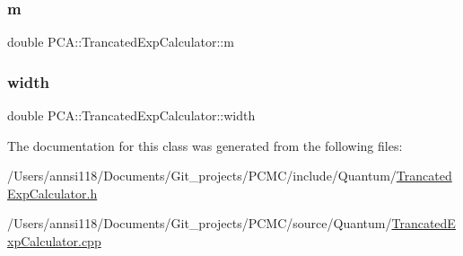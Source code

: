 \subsubsection{\texorpdfstring{m}{m}}
{\footnotesize\ttfamily double P\+C\+A\+::\+Trancated\+Exp\+Calculator\+::m\hspace{0.3cm}{\ttfamily [private]}}

\hypertarget{class_p_c_a_1_1_trancated_exp_calculator_a18ac7bab1a2ddc18bc214a089d05e4ee}{}\label{class_p_c_a_1_1_trancated_exp_calculator_a18ac7bab1a2ddc18bc214a089d05e4ee} 
\subsubsection{\texorpdfstring{width}{width}}
{\footnotesize\ttfamily double P\+C\+A\+::\+Trancated\+Exp\+Calculator\+::width\hspace{0.3cm}{\ttfamily [private]}}



The documentation for this class was generated from the following files\+:\begin{DoxyCompactItemize}
\item 
/\+Users/annsi118/\+Documents/\+Git\+\_\+projects/\+P\+C\+M\+C/include/\+Quantum/\hyperlink{_trancated_exp_calculator_8h}{Trancated\+Exp\+Calculator.\+h}\item 
/\+Users/annsi118/\+Documents/\+Git\+\_\+projects/\+P\+C\+M\+C/source/\+Quantum/\hyperlink{_trancated_exp_calculator_8cpp}{Trancated\+Exp\+Calculator.\+cpp}\end{DoxyCompactItemize}
